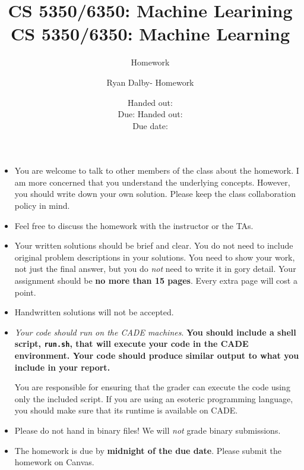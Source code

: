 \documentclass[12pt, fullpage,letterpaper]{article}
\title{CS 5350/6350: Machine Learining \semester}
\author{Homework \assignmentId}
\date{Handed out: \releaseDate\\
	Due: \dueDate}
\title{CS 5350/6350: Machine Learning \semester}
\author{Ryan Dalby- Homework \assignmentId}
\date{Handed out: \releaseDate\\
  Due date: \dueDate}
\begin{document}
\maketitle


\newcommand{\Hcal}{\mathcal{H}} 
{\footnotesize
	\begin{itemize}
		\item You are welcome to talk to other members of the class about
		the homework. I am more concerned that you understand the
		underlying concepts. However, you should write down your own
		solution. Please keep the class collaboration policy in mind.
		
		\item Feel free to discuss the homework with the instructor or the TAs.
		
		\item Your written solutions should be brief and clear. You do not need to include original problem descriptions in your solutions. You need to
		show your work, not just the final answer, but you do \emph{not}
		need to write it in gory detail. Your assignment should be {\bf no
			more than 15 pages}. Every extra page will cost a point.
		
		\item Handwritten solutions will not be accepted.
		
		
		\item {\em Your code should run on the CADE machines}. \textbf{You should
		include a shell script, {\tt run.sh}, that will execute your code
		in the CADE environment. Your code should produce similar output to what you include in your report.}
		
		You are responsible for ensuring that the grader can execute the
		code using only the included script. If you are using an
		esoteric programming language, you should make sure that its
		runtime is available on CADE.
		
		\item Please do not hand in binary files! We will {\em not} grade
		binary submissions.
		
		\item The homework is due by \textbf{midnight of the due date}. Please submit
		the homework on Canvas.
		
	\end{itemize}
}
\end{document}
